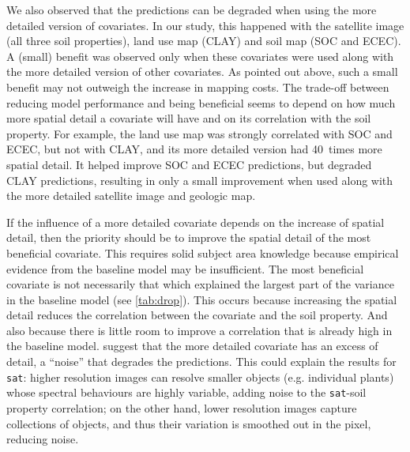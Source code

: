 We also observed that the predictions can be degraded when using the more detailed version of covariates. In 
our study, this happened with the satellite image (all three soil properties), land use map (CLAY) and soil map 
(SOC and ECEC). A (small) benefit was observed only when these covariates were used along with the more 
detailed version of other covariates. As pointed out above, such a small benefit may not outweigh the increase 
in mapping costs. The trade-off between reducing model performance and being beneficial seems to depend on how 
much more spatial detail a covariate will have and on its correlation with the soil property. For example, the 
land use map was strongly correlated with SOC and ECEC, but not with CLAY, and its more detailed version 
had 40~times more spatial detail. It helped improve SOC and ECEC predictions, but degraded CLAY predictions, 
resulting in only a small improvement when used along with the more detailed satellite image and geologic map.

If the influence of a more detailed covariate depends on the increase of spatial detail, then the priority 
should be to improve the spatial detail of the most beneficial covariate. This requires solid subject area 
knowledge because empirical evidence from the baseline model may be insufficient. The most beneficial covariate 
is not necessarily that which explained the largest part of the variance in the baseline model (see 
\autoref{tab:drop}). This occurs because increasing the spatial detail reduces the correlation between the 
covariate and the soil property. And also because there is little room to improve a correlation that is already 
high in the baseline model.  suggest that the more detailed covariate has an 
excess of detail, a ``noise'' that degrades the predictions. This could explain the results for \texttt{sat}: 
higher resolution images can resolve smaller objects (e.g. individual plants) whose spectral behaviours are 
highly variable, adding noise to the \texttt{sat}-soil property correlation; on the other hand, lower 
resolution images capture collections of objects, and thus their variation is smoothed out in the pixel, 
reducing noise.


